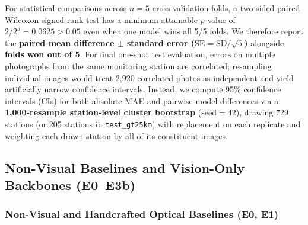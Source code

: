 \documentclass[conference]{IEEEtran}
\begin{document}
For statistical comparisons across $n = 5$ cross-validation folds, a two-sided
paired Wilcoxon signed-rank test has a minimum attainable $p$-value of
$2 / 2^5 = 0.0625 > 0.05$ even when one model wins all 5/5 folds. We therefore
report the \textbf{paired mean difference $\pm$ standard error
($\text{SE} = \text{SD} / \sqrt{5}$)} alongside \textbf{folds won out of 5}. For
final one-shot test evaluation, errors on multiple photographs from the same
monitoring station are correlated; resampling individual images would treat
2,920 correlated photos as independent and yield artificially narrow confidence
intervals. Instead, we compute 95\% confidence intervals (CIs) for both absolute
MAE and pairwise model differences via a \textbf{1,000-resample station-level
cluster bootstrap} ($\text{seed} = 42$), drawing 729 stations (or 205 stations
in \texttt{test\_gt25km}) with replacement on each replicate and weighting each
drawn station by all of its constituent images.

\subsection{Non-Visual Baselines and Vision-Only Backbones (E0--E3b)}
\label{subsec:baselines_backbones}

\subsubsection{Non-Visual and Handcrafted Optical Baselines (E0, E1)}
\end{document}
